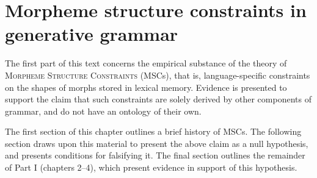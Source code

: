 \chapter{Morpheme structure constraints in generative grammar}
\label{msc}

The first part of this text concerns the empirical substance of the theory of \textsc{Morpheme Structure Constraints} (MSCs), that is, language-specific constraints on the shapes of morphs stored in lexical memory.
Evidence is presented to support the claim that such constraints are solely derived by other components of grammar, and do not have an ontology of their own.

The first section of this chapter outlines a brief history of MSCs.
The following section draws upon this material to present the above claim as a null hypothesis, and presents conditions for falsifying it.
The final section outlines the remainder of Part I (chapters 2--4), which present evidence in support of this hypothesis.





